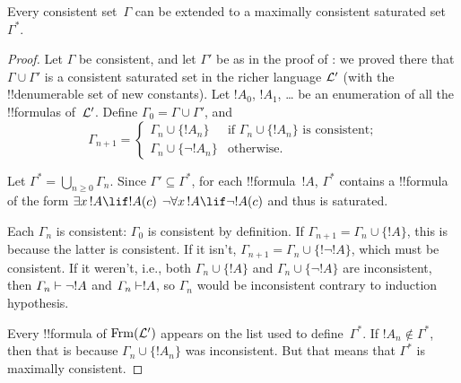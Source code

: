 \documentclass[../../../include/open-logic-section]{subfiles}
\begin{document}

\begin{lem}
Every consistent set~$\Gamma$ can be extended to a maximally
consistent saturated set~$\Gamma^*$.
\end{lem}

\begin{proof}
Let $\Gamma$ be consistent, and let $\Gamma'$ be as in the proof of
: we proved there that $\Gamma \cup \Gamma'$
is a consistent saturated set in the richer language $\mathcal L'$ (with
the !!{denumerable} set of new constants).  Let $!A_0$, $!A_1$, \dots{}
be an enumeration of all the !!{formula}s of~$\mathcal L'$.  Define
$\Gamma_0 = \Gamma \cup \Gamma'$, and
\[
\Gamma_{n+1} =
\begin{cases}
\Gamma_n \cup \{ !A_n \} & \textrm{if $\Gamma_n \cup \{!A_n\}$ is
  consistent;} \\
\Gamma_n \cup \{ \lnot !A_n \} & \textrm{otherwise.}
\end{cases}
\]

Let $\Gamma^* = \bigcup_{n \geq 0} \Gamma_n$. Since $\Gamma' \subseteq
\Gamma^*$, for each !!{formula}~$!A$, $\Gamma^*$ contains a
!!{formula} of the form
{$\lexists[x][!A] \lif !A(c)$}
{$\lnot\lforall[x][!A] \lif \lnot !A(c)$}
and thus is saturated.

Each $\Gamma_n$ is consistent: $\Gamma_0$ is consistent by
definition.  If $\Gamma_{n+1} = \Gamma_n \cup \{!A\}$, this is because
the latter is consistent.  If it isn't, $\Gamma_{n+1} = \Gamma_n \cup
\{!\lnot !A\}$, which must be consistent.  If it weren't, i.e., both
$\Gamma_n \cup \{!A\}$ and $\Gamma_n \cup \{\lnot !A\}$ are
inconsistent, then $\Gamma_n \Proves \lnot !A$ and $\Gamma_n \Proves
!A$, so $\Gamma_n$ would be inconsistent contrary to induction
hypothesis.

Every !!{formula} of $\Frm[L']$ appears on the list used to
define~$\Gamma^*$.  If $!A_n \notin \Gamma^*$, then that is because
$\Gamma_n \cup \{!A_n\}$ was inconsistent.  But that means that
$\Gamma^*$ is maximally consistent.
\end{proof}
\end{document}
